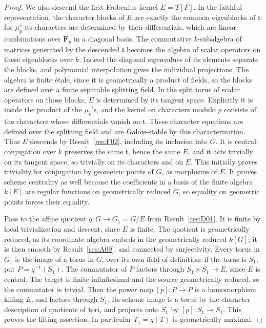 \documentclass[11pt,a4paper,openany,oneside]{book}
\theoremstyle{resultstyle}
\theoremstyle{definition}
\numberwithin{equation}{chapter}
\begin{document}
\begin{proof}
We also descend the first Frobenius kernel \(E=T[F]\).
In the faithful representation, the character blocks of \(E\)
are exactly the common eigenblocks of \(\mathfrak t\):
for \(\mu_p^r\) its characters are determined by their
differentials, which are linear combinations over
\(\mathbf F_p\) in a diagonal basis. The commutative
\(k\)-subalgebra of matrices generated by the descended
\(\mathfrak t\) becomes the algebra of scalar operators
on these eigenblocks over \(\bar k\). Indeed the diagonal
eigenvalues of its elements separate the blocks, and
polynomial interpolation gives the individual projections.
The algebra is finite \'etale, since it is geometrically
a product of fields, so the blocks are defined over a
finite separable splitting field. In the split torus of
scalar operators on those blocks, \(E\) is determined by
its tangent space. Explicitly it is inside the product
of the \(\mu_p\)'s, and the kernel on characters modulo \(p\)
consists of the characters whose differentials vanish
on \(\mathfrak t\). These character equations are defined
over the splitting field and are Galois-stable by this
characterization. Thus \(E\) descends by Result~\ref{res:F02},
including its inclusion into \(G\).
It is central: conjugation over \(\bar k\) preserves the
same \(\mathfrak t\), hence the same \(E\), and it acts
trivially on its tangent space, so trivially on its
characters and on \(E\). This initially proves triviality
for conjugation by geometric points of \(G\), as morphisms
of \(E\). It proves scheme centrality as well because the
coefficients in a basis of the finite algebra \(k[E]\)
are regular functions on geometrically reduced \(G\),
so equality on geometric points forces their equality.

Pass to the affine quotient \(q:G\to G_1=G/E\)
from Result~\ref{res:D01}. It is finite by local
trivialization and descent, since \(E\) is finite.
The quotient is geometrically reduced, as its coordinate
algebra embeds in the geometrically reduced \(k[G]\);
it is then smooth by Result~\ref{res:A09}, and connected
by surjectivity. Every torus in \(G_1\) is the image of
a torus in \(G\), over its own field of definition:
if the torus is \(S_1\), put \(P=q^{-1}(S_1)\).
The commutator of \(P\) factors through
\(S_1\times S_1\to E\), since \(E\) is central. The
target is finite infinitesimal and the source
geometrically reduced, so the commutator is trivial.
Then the power map \([p]:P\to P\) is a homomorphism
killing \(E\), and factors through \(S_1\).
Its scheme image is a torus by the character description
of quotients of tori, and projects onto \(S_1\) by
\([p]:S_1\to S_1\). This proves the lifting assertion.
In particular \(T_1=q(T)\) is geometrically maximal.


\end{proof}
\end{document}
